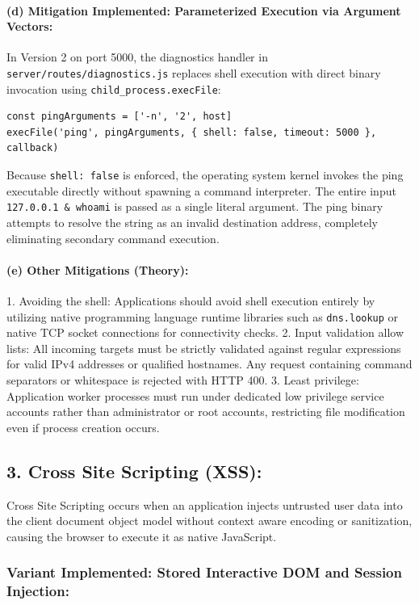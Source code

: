 \documentclass[11pt,a4paper]{article}
\begin{document}
\paragraph*{(d) Mitigation Implemented: Parameterized Execution via Argument Vectors:}
In Version 2 on port 5000, the diagnostics handler in \texttt{server/routes/diagnostics.js} replaces shell execution with direct binary invocation using \texttt{child\_process.execFile}:
\begin{lstlisting}
const pingArguments = ['-n', '2', host]
execFile('ping', pingArguments, { shell: false, timeout: 5000 }, callback)
\end{lstlisting}
Because \texttt{shell: false} is enforced, the operating system kernel invokes the ping executable directly without spawning a command interpreter. The entire input \texttt{127.0.0.1 \& whoami} is passed as a single literal argument. The ping binary attempts to resolve the string as an invalid destination address, completely eliminating secondary command execution.

\paragraph*{(e) Other Mitigations (Theory):}
1. Avoiding the shell: Applications should avoid shell execution entirely by utilizing native programming language runtime libraries such as \texttt{dns.lookup} or native TCP socket connections for connectivity checks.
2. Input validation allow lists: All incoming targets must be strictly validated against regular expressions for valid IPv4 addresses or qualified hostnames. Any request containing command separators or whitespace is rejected with HTTP 400.
3. Least privilege: Application worker processes must run under dedicated low privilege service accounts rather than administrator or root accounts, restricting file modification even if process creation occurs.

\vspace{12pt}
\subsection*{3. Cross Site Scripting (XSS):}
Cross Site Scripting occurs when an application injects untrusted user data into the client document object model without context aware encoding or sanitization, causing the browser to execute it as native JavaScript.

\subsubsection*{Variant Implemented: Stored Interactive DOM and Session Injection:}
\end{document}
